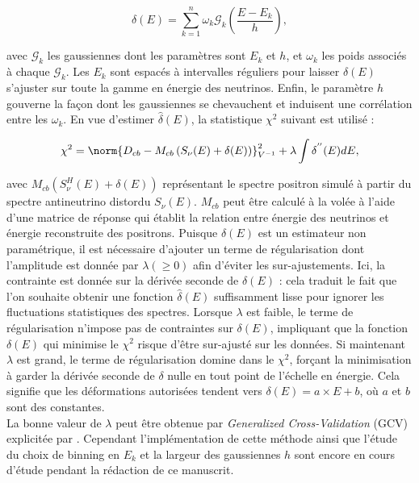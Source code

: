 \begin{equation}
    \delta(E) = \sum_{k = 1}^n \omega_k \mathcal{G}_k\left(\frac{E-E_k}{h} \right),
\end{equation}

avec $\mathcal{G}_k$ les gaussiennes dont les paramètres sont $E_k$ et $h$, et $\omega_k$ les poids associés à chaque $\mathcal{G}_k$. Les $E_k$ sont espacés à intervalles réguliers pour laisser $\delta(E)$ s'ajuster sur toute la gamme en énergie des neutrinos. Enfin, le paramètre $h$ gouverne la façon dont les gaussiennes se chevauchent et induisent une corrélation entre les $\omega_k$. En vue d'estimer $\hat{\delta}(E)$, la statistique $\chi^2$ suivant est utilisé :

\begin{equation}
    \chi^2 = \norm{D_{cb} - M_{cb}\left(S_\nu(E) + \delta(E)\right)}^2_{V^{-1}} + \lambda \int \delta^{''}(E) dE,
\end{equation}

\bigbreak

avec $M_{cb}(S^{H}_\nu(E) + \delta(E))$ représentant le spectre positron simulé à partir du spectre antineutrino distordu $S_{\nu}(E)$. $M_{cb}$ peut être calculé à la volée à l'aide d'une matrice de réponse qui établit la relation entre énergie des neutrinos et énergie reconstruite des positrons. Puisque $\delta(E)$ est un estimateur non paramétrique, il est nécessaire d'ajouter un terme de régularisation dont l'amplitude est donnée par $\lambda (\geq 0)$ afin d'éviter les sur-ajustements. Ici, la contrainte est donnée sur la dérivée seconde de $\delta(E)$ : cela traduit le fait que l'on souhaite obtenir une fonction $\hat{\delta}(E)$ suffisamment lisse pour ignorer les fluctuations statistiques des spectres. Lorsque $\lambda$ est faible, le terme de régularisation n'impose pas de contraintes sur $\delta(E)$, impliquant que la fonction $\delta(E)$ qui minimise le $\chi^2$ risque d'être sur-ajusté sur les données. Si maintenant $\lambda$ est grand, le terme de régularisation domine dans le $\chi^2$, forçant la minimisation à garder la dérivée seconde de $\delta$ nulle en tout point de l'échelle en énergie. Cela signifie que les déformations autorisées tendent vers $\delta(E) = a \times E + b$, où $a$ et $b$ sont des constantes.\\

La \og bonne \fg{} valeur de $\lambda$ peut être obtenue par \og \textit{Generalized Cross-Validation} \fg{} (GCV) explicitée par \cite{10.2307/1268518}. Cependant l'implémentation de cette méthode ainsi que l'étude du choix de binning en $E_k$ et la largeur des gaussiennes $h$ sont encore en cours d'étude pendant la rédaction de ce manuscrit.\\


